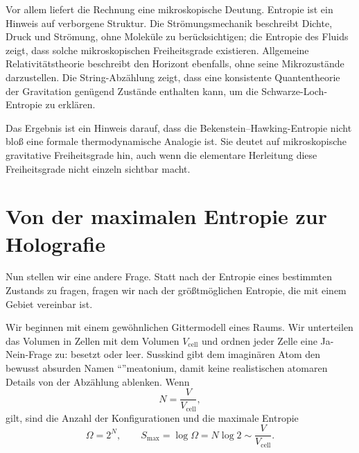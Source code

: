 Vor allem liefert die Rechnung eine mikroskopische Deutung. Entropie ist ein Hinweis auf verborgene Struktur. Die Strömungsmechanik beschreibt Dichte, Druck und Strömung, ohne Moleküle zu berücksichtigen; die Entropie des Fluids zeigt, dass solche mikroskopischen Freiheitsgrade existieren. Allgemeine Relativitätstheorie beschreibt den Horizont ebenfalls, ohne seine Mikrozustände darzustellen. Die String-Abzählung zeigt, dass eine konsistente Quantentheorie der Gravitation genügend Zustände enthalten kann, um die Schwarze-Loch-Entropie zu erklären.

\begin{classroomqa}
\end{classroomqa}

Das Ergebnis ist ein Hinweis darauf, dass die Bekenstein--Hawking-Entropie nicht bloß eine formale thermodynamische Analogie ist. Sie deutet auf mikroskopische gravitative Freiheitsgrade hin, auch wenn die elementare Herleitung diese Freiheitsgrade nicht einzeln sichtbar macht.

\section{Von der maximalen Entropie zur Holografie}

Nun stellen wir eine andere Frage. Statt nach der Entropie eines bestimmten Zustands zu fragen, fragen wir nach der größtmöglichen Entropie, die mit einem Gebiet vereinbar ist.

Wir beginnen mit einem gewöhnlichen Gittermodell eines Raums. Wir unterteilen das Volumen in Zellen mit dem Volumen \(V_{\mathrm{cell}}\) und ordnen jeder Zelle eine Ja-Nein-Frage zu: besetzt oder leer. Susskind gibt dem imaginären Atom den bewusst absurden Namen ``''meatonium, damit keine realistischen atomaren Details von der Abzählung ablenken. Wenn
\begin{equation}
N=\frac{V}{V_{\mathrm{cell}}},
\end{equation}
gilt, sind die Anzahl der Konfigurationen und die maximale Entropie
\begin{equation}
\Omega=2^N,
\qquad
S_{\max}=\log\Omega=N\log2
\sim\frac{V}{V_{\mathrm{cell}}}.
\label{eq:l07-volume-count}
\end{equation}


